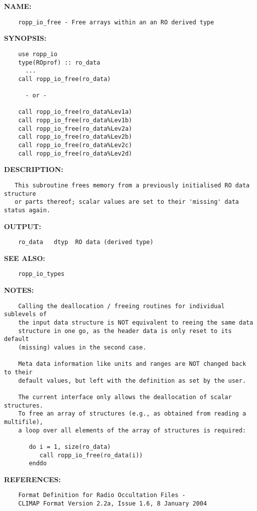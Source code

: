 \label{ch:robo68}
\label{ch:Initialisation_ropp_io_free}
\textbf{NAME:}\hspace{0.08in}\begin{Verbatim}
    ropp_io_free - Free arrays within an an RO derived type
\end{Verbatim}
\textbf{SYNOPSIS:}\hspace{0.08in}\begin{Verbatim}
    use ropp_io
    type(ROprof) :: ro_data
      ...
    call ropp_io_free(ro_data)

      - or -

    call ropp_io_free(ro_data%Lev1a)
    call ropp_io_free(ro_data%Lev1b)
    call ropp_io_free(ro_data%Lev2a)
    call ropp_io_free(ro_data%Lev2b)
    call ropp_io_free(ro_data%Lev2c)
    call ropp_io_free(ro_data%Lev2d)
\end{Verbatim}
\textbf{DESCRIPTION:}\hspace{0.08in}\begin{Verbatim}
   This subroutine frees memory from a previously initialised RO data structure
   or parts thereof; scalar values are set to their 'missing' data status again.
\end{Verbatim}
\textbf{OUTPUT:}\hspace{0.08in}\begin{Verbatim}
    ro_data   dtyp  RO data (derived type)
\end{Verbatim}
\textbf{SEE ALSO:}\hspace{0.08in}\begin{Verbatim}
    ropp_io_types
\end{Verbatim}
\textbf{NOTES:}\hspace{0.08in}\begin{Verbatim}
    Calling the deallocation / freeing routines for individual sublevels of
    the input data structure is NOT equivalent to reeing the same data
    structure in one go, as the header data is only reset to its default
    (missing) values in the second case.

    Meta data information like units and ranges are NOT changed back to their
    default values, but left with the definition as set by the user.

    The current interface only allows the deallocation of scalar structures.
    To free an array of structures (e.g., as obtained from reading a multifile),
    a loop over all elements of the array of structures is required:

       do i = 1, size(ro_data)
          call ropp_io_free(ro_data(i))
       enddo
\end{Verbatim}
\textbf{REFERENCES:}\hspace{0.08in}\begin{Verbatim}
    Format Definition for Radio Occultation Files -
    CLIMAP Format Version 2.2a, Issue 1.6, 8 January 2004
\end{Verbatim}
